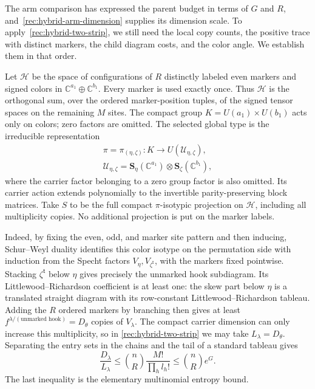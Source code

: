 The arm comparison has expressed the parent budget in terms of $G$
and $R$, and~\eqref{rec:hybrid-arm-dimension} supplies its dimension
scale. To apply~\eqref{rec:hybrid-two-strip}, we still need the local
copy counts, the positive trace with distinct markers, the child
diagram costs, and the color angle. We establish them in that order.

Let $\mathcal H$ be the space of configurations of $R$ distinctly
labeled even markers and signed colors in
$\mathbb C^{a_1}\oplus\mathbb C^{b_1}$. Every marker is used exactly
once. Thus $\mathcal H$ is the orthogonal sum, over the ordered
marker-position tuples, of the signed tensor spaces on the remaining
$M$ sites. The compact group $K=U(a_1)\times U(b_1)$ acts only on
colors; zero factors are omitted.  The selected global type is the
irreducible representation
\[
 \begin{gathered}
 \pi=\pi_{(\eta,\zeta)}:K\longrightarrow
 U(\mathcal U_{\eta,\zeta}),\\
 \mathcal U_{\eta,\zeta}
 =\mathbf S_\eta(\mathbb C^{a_1})
    \otimes\mathbf S_\zeta(\mathbb C^{b_1}),
 \end{gathered}
\]
where the carrier factor belonging to a zero group factor is also
omitted.  Its carrier action extends polynomially to the invertible
parity-preserving block matrices.  Take $S$ to be the full compact
$\pi$-isotypic projection on $\mathcal H$, including all multiplicity
copies. No additional projection is put on the marker labels.

Indeed, by fixing the even, odd, and marker site pattern and then
inducing, Schur--Weyl duality identifies this color isotype on the
permutation side with induction from the Specht factors
$V_\eta,V_{\zeta^{\mathsf t}}$, with the markers fixed pointwise.
Stacking $\zeta^{\mathsf t}$ below $\eta$ gives precisely the
unmarked hook subdiagram. Its Littlewood--Richardson coefficient
is at least one: the skew part below $\eta$ is a translated straight
diagram with its row-constant Littlewood--Richardson tableau.
Adding the $R$ ordered markers by branching then gives at least
$f^{\lambda/(\text{unmarked hook})}=D_\theta$ copies of $V_\lambda$.
The compact carrier dimension can only increase this multiplicity,
so in \eqref{rec:hybrid-two-strip} we may take
$L_\lambda=D_\theta$. Separating the entry sets in the chains and
the tail of a standard tableau gives
\begin{equation}\label{s:hybrid-global-marker-multiplicity}
 \frac{D_\lambda}{L_\lambda}
 \le \binom nR\frac{M!}{\prod_h l_h!}
 \le \binom nR e^G.
\end{equation}
The last inequality is the elementary multinomial entropy bound.

